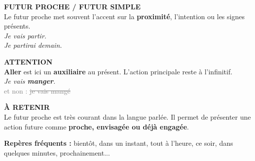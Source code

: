 \documentclass[a4paper,11pt]{article}
\begin{document}
\begin{minipage}{0.91\textwidth}
\vspace{2mm}
\begin{minipage}{0.485\textwidth}
\begin{orangebox}[height=3.15cm]
\textbf{\color{OrangeDark}FUTUR PROCHE / FUTUR SIMPLE}\\[1mm]
Le futur proche met souvent l'accent sur la \textbf{proximité}, l'intention ou les signes présents.\\[1mm]
\textit{Je vais partir.}\\
\textit{Je partirai demain.}
\end{orangebox}
\end{minipage}\hfill
\begin{minipage}{0.485\textwidth}
\begin{warnbox}[height=3.15cm]
\textbf{\color{Red}ATTENTION}\\[1mm]
\textbf{Aller} est ici un \textbf{auxiliaire} au présent. L'action principale reste à l'infinitif.\\[1mm]
\textit{Je vais \textbf{manger}.}\\
\textcolor{Grey}{et non : \sout{je vais mangé}}
\end{warnbox}
\end{minipage}

\vspace{2mm}
\begin{orangebox}
\textbf{\color{OrangeDark}À RETENIR}\\[1mm]
Le futur proche est très courant dans la langue parlée. Il permet de présenter une action future comme \textbf{proche, envisagée ou déjà engagée}.
\end{orangebox}

\vspace{1.5mm}\centering
{\small\color{Grey}\textbf{Repères fréquents :} bientôt, dans un instant, tout à l'heure, ce soir, dans quelques minutes, prochainement...}

\end{minipage}
\end{document}
